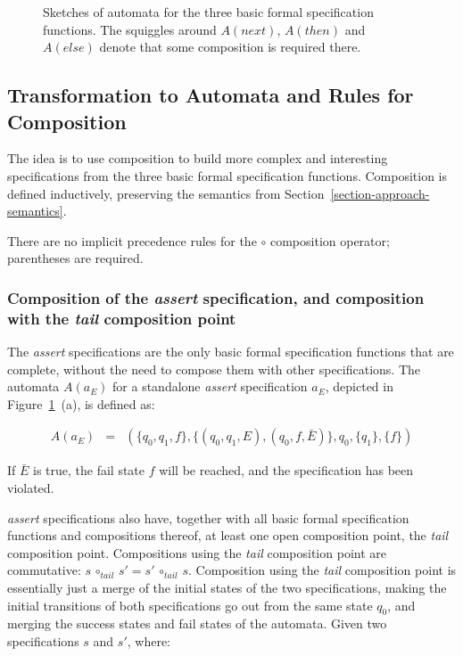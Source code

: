 \documentclass[a4paper,11pt]{kth-mag}
\theoremstyle{definition}
\begin{document}
\begin{figure}[h!]
  \caption{Sketches of automata for the three basic formal specification
    functions. The squiggles around $A(next)$, $A(then)$ and $A(else)$ denote
    that some composition is required there.}
	\label{figure-basic-formal-specification-automata}
\end{figure}


\subsection{Transformation to Automata and Rules for Composition}
\label{section-approach-composition}
\lstset{language=Python,numbers=none}

The idea is to use composition to build more complex and interesting
specifications from the three basic formal specification functions. Composition
is defined inductively, preserving the semantics from
Section~\ref{section-approach-semantics}.

There are no implicit precedence rules for the $\circ$ composition operator;
parentheses are required.


\subsubsection{Composition of the \textit{assert} specification, and
composition with the \textit{tail} composition point}

The \textit{assert} specifications are the only basic formal specification
functions that are complete, without the need to compose them with other
specifications. The automata $A(a_E)$ for a standalone \textit{assert}
specification $a_E$, depicted in
Figure~\ref{figure-basic-formal-specification-automata}~(a), is defined as:

\medskip
\[
  \begin{array}{rcl}
    A(a_E) & = & (\{q_0, q_1, f\}, \{(q_0, q_1, E), (q_0, f, \bar{E})\}, q_0, \{q_1\}, \{f\})
  \end{array}
\]
\medskip

If $\bar{E}$ is true, the fail state $f$ will be reached, and the specification
has been violated.

\textit{assert} specifications also have, together with all basic formal
specification functions and compositions thereof, at least one open composition
point, the \textit{tail} composition point. Compositions using the
\textit{tail} composition point are commutative: $s \, \circ_{tail} \, s' = s'
\, \circ_{tail} \, s$. Composition using the \textit{tail} composition point is
essentially just a merge of the initial states of the two specifications,
making the initial transitions of both specifications go out from the same
state $q_0$, and merging the success states and fail states of the automata. Given two
specifications $s$ and $s'$, where:
\end{document}
